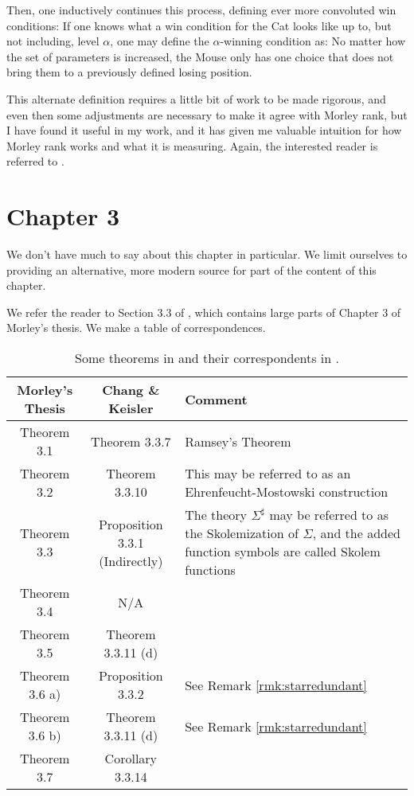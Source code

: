 \documentclass{article}
\theoremstyle{nonumberplain}
\begin{document}
Then, one inductively continues this process, defining ever more convoluted win conditions: If one knows what a win condition for the Cat looks like up to, but not including, level $\alpha$, one may define the $\alpha$-winning condition as: No matter how the set of parameters is increased, the Mouse only has one choice that does not bring them to a previously defined losing position.

This alternate definition requires a little bit of work to be made rigorous, and even then some adjustments are necessary to make it agree with Morley rank, but I have found it useful in my work, and it has given me valuable intuition for how Morley rank works and what it is measuring. Again, the interested reader is referred to \cite{myself_morley_rank}.

\section{Chapter 3}\label{sec:ch3}

We don't have much to say about this chapter in particular. We limit ourselves to providing an alternative, more modern source for part of the content of this chapter.

We refer the reader to Section 3.3 of \cite{cnk}, which contains large parts of Chapter 3 of Morley's thesis. We make a table of correspondences.
\begin{table}[H]
\centering
\renewcommand{\arraystretch}{1.5}
\begin{tabular}{|c|c|p{8cm}|}
\hline
Morley's Thesis \cite{morley} & Chang \& Keisler \cite{cnk} & Comment\\
\hline
\hline
Theorem 3.1 & Theorem 3.3.7 & Ramsey's Theorem\\
\hline
Theorem 3.2 & Theorem 3.3.10 & This may be referred to as an Ehrenfeucht-Mostowski construction\\
\hline
Theorem 3.3 & Proposition 3.3.1 (Indirectly) & The theory $\Sigma^\sharp$ may be referred to as the Skolemization of $\Sigma$, and the added function symbols are called Skolem functions\\
\hline
Theorem 3.4 & N/A & \\
\hline
Theorem 3.5 & Theorem 3.3.11 (d) & \\
\hline
Theorem 3.6 a) & Proposition 3.3.2 & See Remark \ref{rmk:starredundant}\\
\hline
Theorem 3.6 b) & Theorem 3.3.11 (d) & See Remark \ref{rmk:starredundant}\\
\hline
Theorem 3.7 & Corollary 3.3.14 & \\
\hline
\end{tabular}
\caption{Some theorems in \cite{morley} and their correspondents in \cite{cnk}.}
\end{table}
\end{document}
